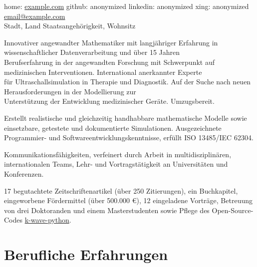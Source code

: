 \documentclass[german, print]{cv-style-wide}
\begin{document}
\settowidth{\bwidth}{BSc}
\settowidth{\mwidth}{MSc}
\settowidth{\pwidth}{PhD}


\begin{center}
home: \href{https://example.com}{example.com} \quad
github: anonymized \quad
linkedin: anonymized \quad
xing: anonymized \quad
\href{mailto:email@example.com}{email@example.com} \\
Stadt, Land \quad Staatsangehörigkeit, Wohnsitz \\
\end{center}

\lastupdated

\vspace{0.5cm}

Innovativer angewandter Mathematiker mit langjähriger Erfahrung in wissenschaftlicher Datenverarbeitung und über 15 Jahren \\
Berufserfahrung in der angewandten Forschung mit Schwerpunkt auf medizinischen Interventionen. International anerkannter Experte \\
für Ultraschallsimulation in Therapie und Diagnostik. Auf der Suche nach neuen Herausforderungen in der Modellierung zur \\
Unterstützung der Entwicklung medizinischer Geräte. Umzugsbereit.
\begin{NoHyphItemize}
  \item Erstellt realistische und gleichzeitig handhabbare mathematische Modelle sowie einsetzbare, getestete und dokumentierte Simulationen. Ausgezeichnete Programmier- und Softwareentwicklungskenntnisse, erfüllt ISO 13485/IEC 62304.
  \item Kommunikationsfähigkeiten, verfeinert durch Arbeit in multidisziplinären, internationalen Teams, Lehr- und Vortragstätigkeit an Universitäten und Konferenzen.
  \item 17 begutachtete Zeitschriftenartikel (über 250 Zitierungen), ein Buchkapitel, eingeworbene Fördermittel (über 500.000 €), 12 eingeladene Vorträge, Betreuung von drei Doktoranden und einem Masterstudenten sowie Pflege des Open-Source-Codes \href{https://k-wave-python.readthedocs.io}{k-wave-python}.
\end{NoHyphItemize}

\section{Berufliche Erfahrungen}
\end{document}
